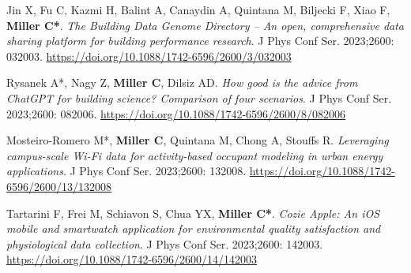 \documentclass[10pt,a4paper]{article}
\begin{document}
\begin{small}
\begin{etaremune}
Jin X, Fu C, Kazmi H, Balint A, Canaydin A, Quintana M, Biljecki F, Xiao F, \textbf{Miller C*}. \emph{The Building Data Genome Directory – An open, comprehensive data sharing platform for building performance research}. J Phys Conf Ser. 2023;2600: 032003. \url{https://doi.org/10.1088/1742-6596/2600/3/032003}
\item
Rysanek A*, Nagy Z, \textbf{Miller C}, Dilsiz AD. \emph{How good is the advice from ChatGPT for building science? Comparison of four scenarios}. J Phys Conf Ser. 2023;2600: 082006. \url{https://doi.org/10.1088/1742-6596/2600/8/082006}
\item
Mosteiro-Romero M*, \textbf{Miller C}, Quintana M, Chong A, Stouffs R. \emph{Leveraging campus-scale Wi-Fi data for activity-based occupant modeling in urban energy applications}. J Phys Conf Ser. 2023;2600: 132008. \url{https://doi.org/10.1088/1742-6596/2600/13/132008}
\item
Tartarini F, Frei M, Schiavon S, Chua YX, \textbf{Miller C*}. \emph{Cozie Apple: An iOS mobile and smartwatch application for environmental quality satisfaction and physiological data collection}. J Phys Conf Ser. 2023;2600: 142003. \url{https://doi.org/10.1088/1742-6596/2600/14/142003}



\end{etaremune}
\end{small}
\end{document}
